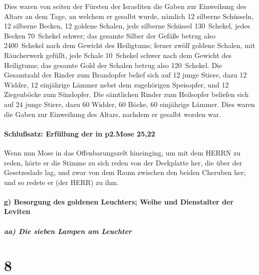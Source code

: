 Dies waren von seiten der Fürsten der Israeliten die
Gaben zur Einweihung des Altars an dem Tage, an welchem er gesalbt
wurde, nämlich 12 silberne Schüsseln, 12 silberne Becken, 12 goldene
Schalen, jede silberne Schüssel 130~Schekel, jedes Becken
70~Schekel schwer; das gesamte Silber der Gefäße betrug also
2400~Schekel nach dem Gewicht des Heiligtums; ferner
zwölf goldene Schalen, mit Räucherwerk gefüllt, jede Schale 10~Schekel
schwer nach dem Gewicht des Heiligtums; das gesamte Gold der Schalen
betrug also 120~Schekel. Die Gesamtzahl der Rinder zum
Brandopfer belief sich auf 12 junge Stiere, dazu 12 Widder, 12
einjährige Lämmer nebst dem zugehörigen Speisopfer, und 12 Ziegenböcke
zum Sündopfer. Die sämtlichen Rinder zum Heilsopfer
beliefen sich auf 24 junge Stiere, dazu 60 Widder, 60 Böcke, 60
einjährige Lämmer. Dies waren die Gaben zur Einweihung des Altars,
nachdem er gesalbt worden war.

\hypertarget{schluuxdfsatz-erfuxfcllung-der-in-p2.mose-2522}{%
\paragraph{Schlußsatz: Erfüllung der in \textbar p2.Mose
25,22}\label{schluuxdfsatz-erfuxfcllung-der-in-p2.mose-2522}}

Wenn nun Mose in das Offenbarungszelt hineinging, um mit
dem HERRN zu reden, hörte er die Stimme zu sich reden von der Deckplatte
her, die über der Gesetzeslade lag, und zwar von dem Raum zwischen den
beiden Cheruben her; und so redete er (der HERR) zu ihm.

\hypertarget{g-besorgung-des-goldenen-leuchters-weihe-und-dienstalter-der-leviten}{%
\paragraph{g) Besorgung des goldenen Leuchters; Weihe und Dienstalter
der
Leviten}\label{g-besorgung-des-goldenen-leuchters-weihe-und-dienstalter-der-leviten}}

\hypertarget{aa-die-sieben-lampen-am-leuchter}{%
\subparagraph{aa) Die sieben Lampen am
Leuchter}\label{aa-die-sieben-lampen-am-leuchter}}

\hypertarget{section-7}{%
\section{8}\label{section-7}}

